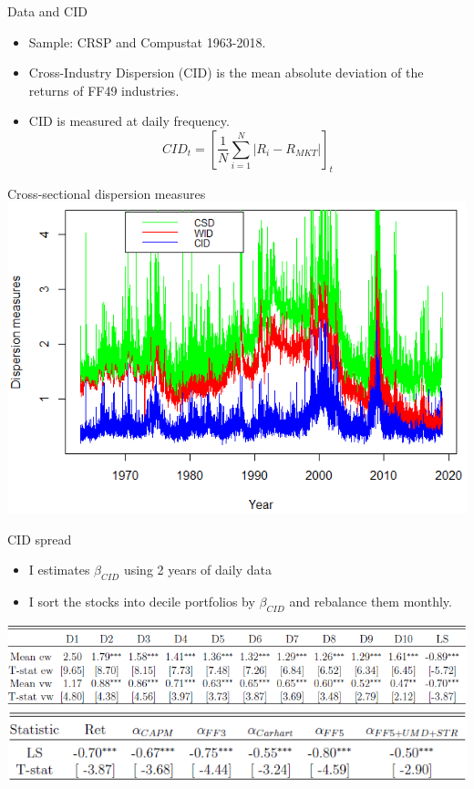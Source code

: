 \documentclass{beamer}
\begin{document}
\begin{frame}{Data and CID}
\begin{itemize}
    \item {Sample: CRSP and Compustat 1963-2018.}
    \item {Cross-Industry Dispersion (CID) is the mean absolute deviation of the returns of FF49 industries.}
    \item {CID is measured at daily frequency.}
    $$CID_t = [\frac{1}{N}\sum^{N}_{i=1}{|R_i-R_{MKT}|}]_t$$
\end{itemize}
\end{frame}



\begin{frame}{Cross-sectional dispersion measures}
\includegraphics[width=1\textwidth]{cidwid.png}
\end{frame}



\begin{frame}{CID spread}
\begin{itemize}
    \item {I estimates $\beta_{CID}$ using 2 years of daily data}
    \item {I sort the stocks into decile portfolios by $\beta_{CID}$ and rebalance them monthly.}
\end{itemize}
\includegraphics[width=1\textwidth]{table_spread.png}
\\
\includegraphics[width=1\textwidth]{abnormal_spread.png}
\end{frame}
\end{document}
